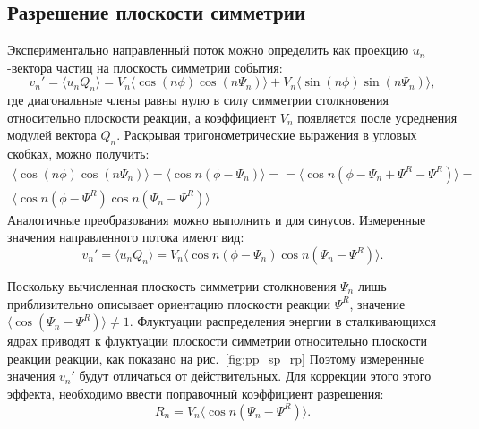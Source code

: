 \subsection{Разрешение плоскости симметрии}

Экспериментально направленный поток можно определить как проекцию $u_n$-вектора частиц на плоскость симметрии события:
%
\begin{equation}
    v_n' =  \langle u_n Q_n \rangle = 
    V_n \langle \cos (n\phi) \cos (n\Psi_n) \rangle + V_n \langle \sin(n\phi) \sin(n\Psi_n) \rangle,
\end{equation}
%
где диагональные члены равны нулю в силу симметрии столкновения относительно плоскости реакции, а коэффициент $V_n$ появляется после усреднения модулей вектора $Q_n$.
Раскрывая тригонометрические выражения в угловых скобках, можно получить:
%
\begin{equation}
\begin{align}
    \langle \cos (n\phi) \cos (n\Psi_n) \rangle = \langle \cos n ( \phi - \Psi_n ) \rangle = 
    = \langle \cos n ( \phi - \Psi_n + \Psi^R - \Psi^R ) \rangle = \\
    \langle \cos n ( \phi - \Psi^R ) \cos n (\Psi_n - \Psi^R ) \rangle
\end{align}
\end{equation}
%
Аналогичные преобразования можно выполнить и для синусов. 
Измеренные значения направленного потока имеют вид:
%
\begin{equation}
    v_n' =  \langle u_n Q_n \rangle = 
    V_n \langle \cos n ( \phi - \Psi_n ) \cos n (\Psi_n - \Psi^R) \rangle.
    \label{eq:uq_transformation}
\end{equation}
%

Поскольку вычисленная плоскость симметрии столкновения $\Psi_n$ лишь приблизительно описывает ориентацию плоскости реакции $\Psi^R$, значение $ \langle \cos(\Psi_n - \Psi^R) \rangle \ne 1 $.
Флуктуации распределения энергии в сталкивающихся ядрах приводят к флуктуации плоскости симметрии относительно плоскости реакции реакции, как показано на рис.~\ref{fig:pp_sp_rp}
Поэтому измеренные значения $v_n'$ будут отличаться от действительных.
Для коррекции этого этого эффекта, необходимо ввести поправочный коэффициент разрешения:
%
\begin{equation}
    R_n = V_n \langle \cos n (\Psi_n - \Psi^R) \rangle.
\end{equation}
%

